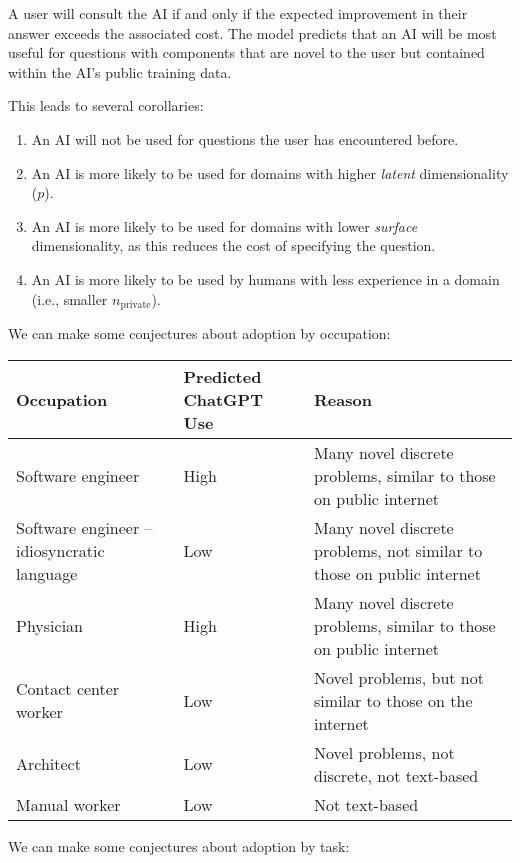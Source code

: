 \documentclass[11pt]{article}
\begin{document}
A user will consult the AI if and only if the expected improvement in their answer exceeds the associated cost. The model predicts that an AI will be most useful for questions with components that are novel to the user but contained within the AI's public training data.

This leads to several corollaries:
\begin{enumerate}[label=\arabic*., leftmargin=2em]
  \item An AI will not be used for questions the user has encountered before.
  \item An AI is more likely to be used for domains with higher \emph{latent} dimensionality ($p$).
  \item An AI is more likely to be used for domains with lower \emph{surface} dimensionality, as this reduces the cost of specifying the question.
  \item An AI is more likely to be used by humans with less experience in a domain (i.e., smaller $n_{\text{private}}$).
\end{enumerate}

We can make some conjectures about adoption by occupation:

\begin{center}
\begin{tabular}{p{}p{}p{}}
\toprule
Occupation & Predicted ChatGPT Use & Reason \\
\midrule
Software engineer & High & Many novel discrete problems, similar to those on public internet \\
Software engineer -- idiosyncratic language & Low & Many novel discrete problems, not similar to those on public internet \\
Physician & High & Many novel discrete problems, similar to those on public internet \\
Contact center worker & Low & Novel problems, but not similar to those on the internet \\
Architect & Low & Novel problems, not discrete, not text-based \\
Manual worker & Low & Not text-based \\
\bottomrule
\end{tabular}
\end{center}

We can make some conjectures about adoption by task:
\end{document}
